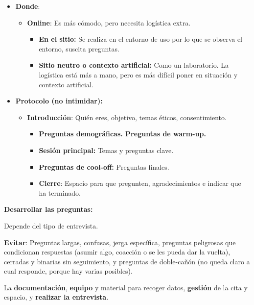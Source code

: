 \begin{itemize}
\tightlist
\item
  \textbf{Donde}:

  \begin{itemize}
  \tightlist
  \item
    \textbf{Online}: Es más cómodo, pero necesita logística extra.

    \begin{itemize}
    \tightlist
    \item
      \textbf{En el sitio:} Se realiza en el entorno de uso por lo que
      se observa el entorno, suscita preguntas.
    \item
      \textbf{Sitio neutro o contexto artificial:} Como un laboratorio.
      La logística está más a mano, pero es más difícil poner en
      situación y contexto artificial.
    \end{itemize}
  \end{itemize}
\item
  \textbf{Protocolo (no intimidar):}

  \begin{itemize}
  \tightlist
  \item
    \textbf{Introducción}: Quién eres, objetivo, temas éticos,
    consentimiento.

    \begin{itemize}
    \tightlist
    \item
      \textbf{Preguntas demográficas. Preguntas de warm-up.}
    \item
      \textbf{Sesión principal:} Temas y preguntas clave.
    \item
      \textbf{Preguntas de cool-off:} Preguntas finales.
    \item
      \textbf{Cierre}: Espacio para que pregunten, agradecimientos e
      indicar que ha terminado.
    \end{itemize}
  \end{itemize}
\end{itemize}

\textbf{Desarrollar las preguntas:}

Depende del tipo de entrevista.

\textbf{Evitar}: Preguntas largas, confusas, jerga específica, preguntas
peligrosas que condicionan respuestas (asumir algo, coacción o se les
pueda dar la vuelta), cerradas y binarias sin seguimiento, y preguntas
de doble-cañón (no queda claro a cual responde, porque hay varias
posibles).

La \textbf{documentación}, \textbf{equipo} y material para recoger
datos, \textbf{gestión} de la cita y espacio, y \textbf{realizar la
entrevista}.


